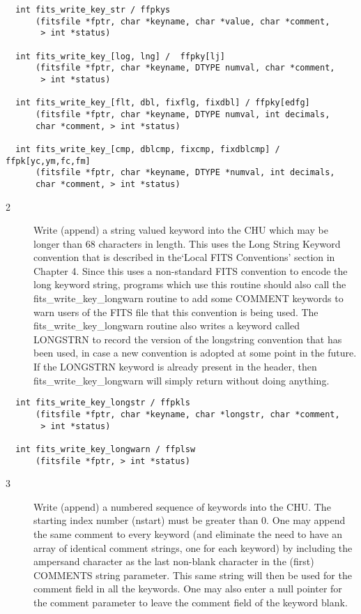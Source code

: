 \documentclass[11pt]{book}
\begin{document}
\begin{verbatim}
  int fits_write_key_str / ffpkys
      (fitsfile *fptr, char *keyname, char *value, char *comment,
       > int *status)

  int fits_write_key_[log, lng] /  ffpky[lj]
      (fitsfile *fptr, char *keyname, DTYPE numval, char *comment,
       > int *status)

  int fits_write_key_[flt, dbl, fixflg, fixdbl] / ffpky[edfg]
      (fitsfile *fptr, char *keyname, DTYPE numval, int decimals,
      char *comment, > int *status)

  int fits_write_key_[cmp, dblcmp, fixcmp, fixdblcmp] / ffpk[yc,ym,fc,fm]
      (fitsfile *fptr, char *keyname, DTYPE *numval, int decimals,
      char *comment, > int *status)
\end{verbatim}

\begin{description}
\item[2 ] Write (append) a string valued keyword into the CHU which may be longer
    than 68 characters in length.  This uses the Long String Keyword
    convention that is described in the`Local FITS Conventions' section
    in Chapter 4.  Since this uses a non-standard FITS convention to
    encode the long keyword string, programs which use this routine
    should also call the fits\_write\_key\_longwarn routine to add some
    COMMENT keywords to warn users of the FITS file that this
    convention is being used.  The fits\_write\_key\_longwarn routine
    also writes a keyword called LONGSTRN to record the version of the
    longstring convention that has been used, in case a new convention
    is adopted at some point in the future.   If the LONGSTRN keyword
    is already present in the header, then fits\_write\_key\_longwarn
    will
   simply return without doing anything. \label{ffpkls} \label{ffplsw}
\end{description}

\begin{verbatim}
  int fits_write_key_longstr / ffpkls
      (fitsfile *fptr, char *keyname, char *longstr, char *comment,
       > int *status)

  int fits_write_key_longwarn / ffplsw
      (fitsfile *fptr, > int *status)
\end{verbatim}

\begin{description}
\item[3 ] Write (append) a numbered sequence of keywords into the CHU.  The
    starting index number (nstart) must be greater than 0. One may
    append the same comment to every keyword (and eliminate the need
    to have an array of identical comment strings, one for each keyword) by
    including the ampersand character as the last non-blank character in the
    (first) COMMENTS string parameter.  This same string
    will then be used for the comment field in all the keywords.
    One may also enter a null pointer for the comment parameter to
   leave the comment field of the keyword blank. \label{ffpknx}
\end{description}
\end{document}
